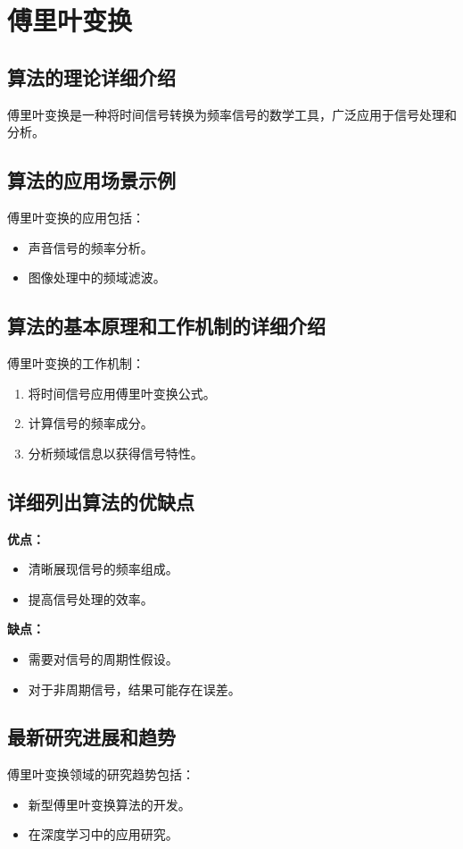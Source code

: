 \section{傅里叶变换}
\subsection*{算法的理论详细介绍}
傅里叶变换是一种将时间信号转换为频率信号的数学工具，广泛应用于信号处理和分析。

\subsection*{算法的应用场景示例}
傅里叶变换的应用包括：
\begin{itemize}
    \item 声音信号的频率分析。
    \item 图像处理中的频域滤波。
\end{itemize}

\subsection*{算法的基本原理和工作机制的详细介绍}
傅里叶变换的工作机制：
\begin{enumerate}
    \item 将时间信号应用傅里叶变换公式。
    \item 计算信号的频率成分。
    \item 分析频域信息以获得信号特性。
\end{enumerate}

\subsection*{详细列出算法的优缺点}
\textbf{优点：}
\begin{itemize}
    \item 清晰展现信号的频率组成。
    \item 提高信号处理的效率。
\end{itemize}

\textbf{缺点：}
\begin{itemize}
    \item 需要对信号的周期性假设。
    \item 对于非周期信号，结果可能存在误差。
\end{itemize}

\subsection*{最新研究进展和趋势}
傅里叶变换领域的研究趋势包括：
\begin{itemize}
    \item 新型傅里叶变换算法的开发。
    \item 在深度学习中的应用研究。
\end{itemize}

